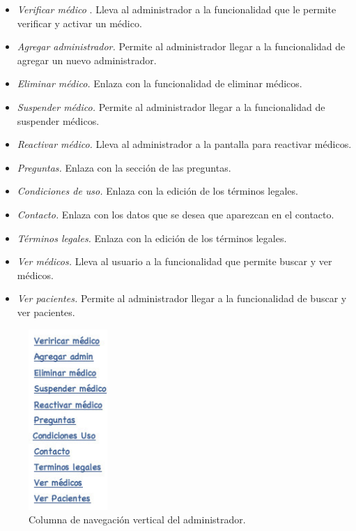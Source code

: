 		\begin{itemize}
			\item \textit{Verificar médico }. Lleva al administrador a la funcionalidad que le permite verificar y activar un médico.
			\item \textit{Agregar administrador.} Permite al administrador llegar a la funcionalidad de agregar un nuevo administrador.
			\item \textit{Eliminar médico.} Enlaza con la funcionalidad de eliminar médicos.
			\item \textit{Suspender médico.} Permite al administrador llegar a la funcionalidad de suspender médicos.
			\item \textit{Reactivar médico.} Lleva al administrador a la pantalla para reactivar médicos.
			\item \textit{Preguntas.} Enlaza con la sección de las preguntas.
			\item \textit{Condiciones de uso.} Enlaza con la edición de los términos legales.
			\item \textit{Contacto.} Enlaza con los datos que se desea que aparezcan en el contacto.
			\item \textit{Términos legales.} Enlaza con la edición de los términos legales.
			\item \textit{Ver médicos.} Lleva al usuario a la funcionalidad que permite buscar y ver médicos. 
			\item \textit{Ver pacientes.} Permite al administrador llegar a la funcionalidad de buscar y ver pacientes.
		\end{itemize}
		
		\begin{figure}[H]
		  \centering
		    \includegraphics[width=3cm]{img/jpg/nav/administrador_lat1.jpg}
		  \caption{Columna de navegación vertical del administrador.}
		  \label{fig:nav_administrador_lat1}
		\end{figure}
		

